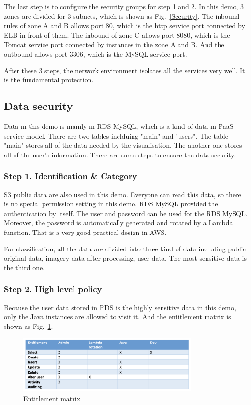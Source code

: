 \documentclass[conference]{IEEEtran}
\begin{document}
The last step is to configure the security groups for step 1 and 2. In this demo, 3 zones are divided for 3 subnets, which is shown as Fig.~\ref{Security}. The inbound 
rules of zone A and B allows port 80, which is the http service port connected by ELB in front of them. The inbound of zone C allows port 8080, which is the Tomcat 
service port connected by instances in the zone A and B. And the outbound allows port 3306, which is the MySQL service port.

After these 3 steps, the network environment isolates all the services very well. It is the fundamental protection.


\subsection{Data security}

Data in this demo is mainly in RDS MySQL, which is a kind of data in PaaS service model. There are two tables inclduing "main" and "users". The table "main" 
stores all of the data needed by the visualisation. The another one stores all of the user's information. There are some steps to ensure the data security.

\subsubsection{Step 1. Identification \& Category}

S3 public data are also used in this demo. Everyone can read this data, so there is no special permission setting in this demo. RDS MySQL provided the authentication 
by itself. The user and password can be used for the RDS MySQL. Moreover, the password is automatically generated and rotated by a Lambda function. That is a  
very good practical design in AWS.

For classification, all the data are divided into three kind of data including public original data, imagery data after processing, user data. The most sensitive 
data is the third one. 

\subsubsection{Step 2. High level policy}

Because the user data stored in RDS is the highly sensitive data in this demo, only the Java instances are allowed to visit it. And the entitlement matrix 
is shown as Fig.~\ref{matrix}.

\begin{figure}[htbp]
    \centerline{\includegraphics[width=260pt]{images/matrix.png}}
    \caption{Entitlement matrix}
    \label{matrix}
\end{figure}
\end{document}
